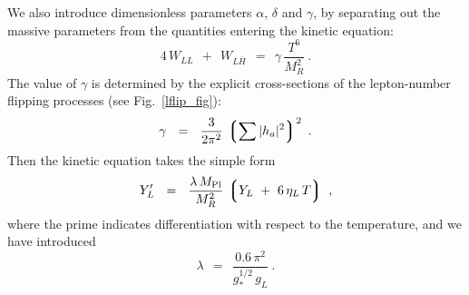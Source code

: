 \documentclass[12pt]{revtex4}
\newcommand{\lgr}{\left\lgroup}
\newcommand{\rgr}{\right\rgroup}
\newcommand{\Mpl}{M_{\rm Pl}}
\newcommand{\ov}{\overline}
\begin{document}
	We also introduce dimensionless parameters $ \alpha $, 
	$ \delta $ and $ \gamma $, by separating out the massive
	parameters from the quantities entering the kinetic equation:
\begin{equation*}
	4\, W_{LL} ~~+~~ W_{L\ov{H}} ~~=~~ 
		 \gamma\, \frac{T^6}{M_R^2}~.
\end{equation*}
	The value of $ \gamma $ is determined by the explicit 
	cross-sections of the lepton-number flipping processes
	(see Fig.~\ref{lflip_fig}):
\[
	\gamma  ~~=~~ \frac{3}{2\pi^2}\, \lgr \sum |h_a|^2 \rgr^2~.
\]
	Then the kinetic equation takes the simple form
\begin{equation}
\label{btz_simple}
	Y_L' ~~=~~ \frac{\lambda\,\Mpl}{M_R^2} \,
			\lgr Y_L ~+~ 6\,\eta_L\, T \rgr~,
\end{equation}
	where the prime indicates differentiation with respect to
	the temperature,
	and we have introduced
\[
	\lambda ~~=~~ \frac{0.6\, \pi^2}
    		         {g_*^{1/2}\, g_L}~.
\]
	
\end{document}
